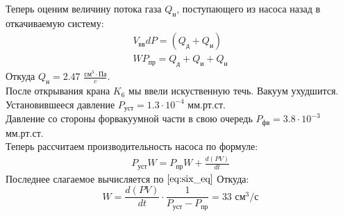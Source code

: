 Теперь оценим величину потока газа $Q_{\text{н}}$, поступающего из насоса
назад в откачиваемую систему:
\begin{align}
    V_{\text{вв}}dP = (Q_{\text{д}} + Q_{\text{и}})\\ 
    W P_{\text{пр}} = Q_{\text{д}} + Q_{\text{и}} + Q_{\text{н}}
\end{align}
Откуда $Q_{\text{н}} = 2.47$ $\frac{\text{см}^3 \cdot \text{Па}}{c}$.\\ 
После открывания крана $K_6$ мы ввели искуственную течь. Вакуум ухудшится. 
Установившееся давление $P_{\text{уст}} = 1.3\cdot 10^{-4}$ мм.рт.ст.\\ 
Давление со стороны форвакуумной части в свою очередь $P_{\text{фв}} = 3.8\cdot 10^{-3}$ мм.рт.ст.\\
Теперь рассчитаем производительность насоса по формуле:
\begin{align}
    P_{\text{уст}} W = P_{\text{пр}} W + \frac{d(PV)}{dt}
\end{align}
Последнее слагаемое вычисляется по $\ref{eq:six_eq}$ Откуда:
\begin{equation}
    W = \frac{d(PV)}{dt} \cdot \frac{1}{P_{\text{уст}} - P_{\text{пр}}} = 33 \text{ см}^3 / \text{с} 
\end{equation}



